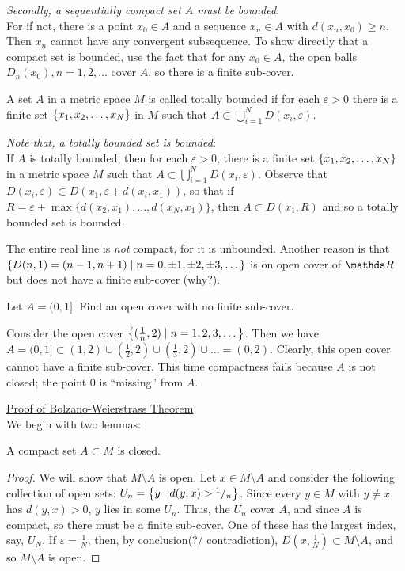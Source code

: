 \documentclass[../main-sheet.tex]{subfiles}
\begin{document}
\emph{Secondly, a sequentially compact set $ A $ must be bounded}:\\
For if not, there is a point $ x_0\in A $ and a sequence $ x_n\in A $ with $ d(x_n,x_0)\geq n $. Then $ x_n  $ cannot have any convergent subsequence. To show directly that a compact set is bounded, use the fact that for any $ x_0\in A $, the open balls $ D_n(x_0), n=1,2,\dots $ cover $ A $, so there is a finite sub-cover.
\begin{defn}
    A set $ A  $ in a metric space $ M $ is called totally bounded if for each $ \varepsilon>0 $ there is a finite set $ \left\{x_1,x_2,\dots,x_N\right\} $ in $ M $ such that $ A\subset \bigcup_{i=1}^N D(x_i,\varepsilon) $.
\end{defn}

\emph{Note that, a totally bounded set is bounded}:\\
If $ A $ is totally bounded, then for each $ \varepsilon>0 $, there is a finite set $ \left\{x_1,x_2,\dots,x_N\right\} $ in a metric space $ M $ such that $ A\subset \bigcup_{i=1}^N D(x_i,\varepsilon) $. Observe that $ D(x_i,\varepsilon)\subset D(x_1,\varepsilon+d(x_i,x_1)) $, so that if $ R=\varepsilon+\max\{d(x_2,x_1),\dots,d(x_N,x_1)\} $, then $ A\subset D(x_1,R) $ and so a totally bounded set is bounded.
\begin{ex}
    The entire real line is \emph{not} compact, for it is unbounded. Another reason is that\\ $ \left\{D(n,1)=(n-1,n+1)\mid n=0,\pm 1,\pm 2,\pm 3,\dots\right\} $ is on open cover of $ \R $ but does not have a finite sub-cover (why?).
\end{ex}
\begin{prob}
    Let $ A=(0,1] $. Find an open cover with no finite sub-cover.
\end{prob}
\begin{soln}
    Consider the open cover $ \left\{(\frac{1}{n},2)\mid n=1,2,3,\dots\right\} $. Then we have $ A=(0,1]\subset (1,2)\cup (\frac{1}{2},2)\cup (\frac{1}{3},2)\cup \dots=(0,2) $. Clearly, this open cover cannot have a finite sub-cover. This time compactness fails because $ A $ is not closed; the point $ 0 $ is ``missing'' from $ A $.
\end{soln}
\underline{Proof of Bolzano-Weierstrass  Theorem}\\
We begin with two lemmas:
\begin{lem}
    \label{lem:1}
    A compact set $ A\subset M $ is closed.
\end{lem}
\begin{proof}
    We will show that $ M\setminus A $ is open. Let $ x\in M\setminus A $ and consider the following collection of open sets: $ U_n=\left\{y\mid d(y,x)>{}^{1}/{}_{n}\right\} $. Since every $ y\in M $ with $ y\neq x $ has $ d(y,x)>0 $, $ y $ lies in some $ U_n $. Thus, the $ U_n $ cover $ A $, and since $ A$ is compact, so there must be a finite sub-cover. One of these has the largest index, say, $ U_N $. If $ \varepsilon=\frac{1}{N} $, then, by conclusion(?/ contradiction), $ D(x,\frac{1}{N})\subset M\setminus A  $, and so $ M\setminus A $ is open.  
\end{proof}
\end{document}
